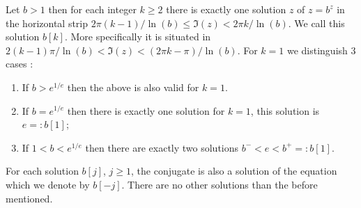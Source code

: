 
\begin{proposition}
  Let $b>1$ then for each integer $k\ge 2$ there is exactly one solution
  $z$ of $z=b^z$ in the horizontal strip $2\pi
  (k-1)/\ln(b)\le\Im(z)<2\pi k/\ln(b)$. We call this solution
  $b[k]$. More specifically it is
  situated in $2(k-1)\pi/\ln(b) < \Im(z) < (2\pi k -\pi)/\ln(b)$. For $k=1$ we distinguish 3 cases :
  \begin{enumerate}
  \item If $b>e^{1/e}$ then the above is also valid for $k=1$.
  \item
  If $b=e^{1/e}$ then there is exactly one solution for $k=1$,
  this solution is $e=:b[1]$;
  \item
  If $1<b<e^{1/e}$ then there are exactly two solutions
  $b^-<e<b^+=:b[1]$.
  \end{enumerate}
  For each solution $b[j]$, $j\ge 1$, the conjugate is also a
  solution of the equation which we denote by $b[-j]$. There are no
  other solutions than the before mentioned.
\end{proposition}
